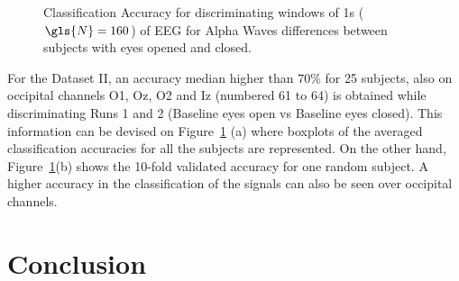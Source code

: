 \begin{figure}[h!]
\centering
{}
\caption[PhysioNet Dataset Classification Rate]{Classification Accuracy for discriminating windows of 1s ($\gls{N} = 160$) of EEG for Alpha Waves differences between subjects with eyes opened and closed.}
\label{fig:alpharesultsdatasetii}
\end{figure}


For the Dataset II, an accuracy median higher than $70\%$ for 25 subjects, also on occipital channels O1, Oz, O2 and Iz (numbered 61 to 64) is obtained while discriminating Runs 1 and 2 (Baseline eyes open vs Baseline eyes closed).  This information can be devised on Figure~\ref{fig:alpharesultsdatasetii}   (a) where boxplots of the averaged classification accuracies for all the subjects are represented.  On the other hand, Figure~\ref{fig:alpharesultsdatasetii}(b) shows the 10-fold validated accuracy for one random subject. A higher accuracy in the classification of the signals can also be seen over occipital channels.

\section{Conclusion}

